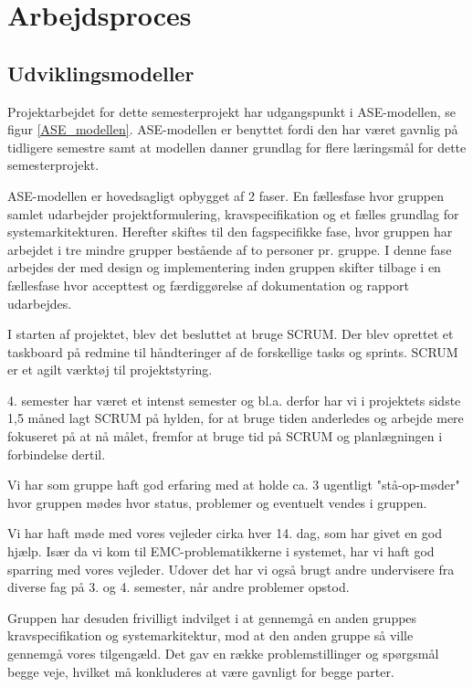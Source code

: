 
\chapter{Arbejdsproces}

\section{Udviklingsmodeller}

Projektarbejdet for dette semesterprojekt har udgangspunkt i ASE-modellen, se figur \ref{ASE_modellen}. ASE-modellen er benyttet fordi den har været gavnlig på tidligere semestre samt at modellen danner grundlag for flere læringsmål for dette semesterprojekt.

ASE-modellen er hovedsagligt opbygget af 2 faser. En fællesfase hvor gruppen samlet udarbejder projektformulering, kravspecifikation og et fælles grundlag for systemarkitekturen. Herefter skiftes til den fagspecifikke fase, hvor gruppen har arbejdet i tre mindre grupper bestående af to personer pr. gruppe. I denne fase arbejdes der med design og implementering inden gruppen skifter tilbage i en fællesfase hvor accepttest og færdiggørelse af dokumentation og rapport udarbejdes. 


I starten af projektet, blev det besluttet at bruge SCRUM. Der blev oprettet et taskboard på redmine til håndteringer af de forskellige tasks og sprints. SCRUM er et agilt værktøj til projektstyring. 

4. semester har været et intenst semester og bl.a. derfor har vi i projektets sidste 1,5 måned lagt SCRUM på hylden, for at bruge tiden anderledes og arbejde mere fokuseret på at nå målet, fremfor at bruge tid på SCRUM og planlægningen i forbindelse dertil. 

Vi har som gruppe haft god erfaring med at holde ca. 3 ugentligt "stå-op-møder" hvor gruppen mødes hvor status, problemer og eventuelt vendes i gruppen. 

Vi har haft møde med vores vejleder cirka hver 14. dag, som har givet en god hjælp. Især da vi kom til EMC-problematikkerne i systemet, har vi haft god sparring med vores vejleder. Udover det har vi også brugt andre undervisere fra diverse fag på 3. og 4. semester, når andre problemer opstod.

Gruppen har desuden frivilligt indvilget i at gennemgå en anden gruppes kravspecifikation og systemarkitektur, mod at den anden gruppe så ville gennemgå vores tilgengæld. Det gav en række problemstillinger og spørgsmål begge veje, hvilket må konkluderes at være gavnligt for begge parter.

